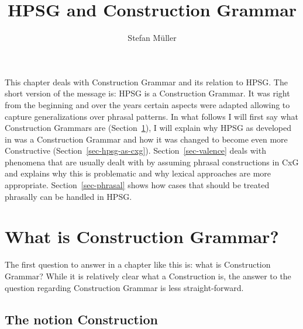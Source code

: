 \documentclass[output=paper]{langsci/langscibook}
\author{Stefan Müller\affiliation{Humboldt-Universität zu Berlin}}
\title{HPSG and Construction Grammar}
\begin{document}

This chapter deals with Construction Grammar and its relation to HPSG. The short version of the
message is: HPSG is a Construction Grammar. It was right from the beginning and over the years
certain aspects were adapted allowing to capture generalizations over phrasal patterns. In what
follows I will first say what Construction Grammars are (Section~\ref{sec-cxg}), I will explain why
HPSG as developed in  was a Construction Grammar and how it was changed to become even
more Constructive (Section~\ref{sec-hpsg-as-cxg}). Section~\ref{sec-valence} deals with phenomena
that are usually dealt with by assuming phrasal constructions in CxG and explains why this is
problematic and why lexical approaches are more appropriate. Section~\ref{sec-phrasal} shows how
cases that should be treated phrasally can be handled in HPSG.

\section{What is Construction Grammar?}
\label{sec-cxg}

The first question to answer in a chapter like this is: what is Construction Grammar? While it is
relatively clear what a Construction is, the answer to the question regarding Construction Grammar
is less straight-forward. 

\subsection{The notion Construction}
\end{document}
